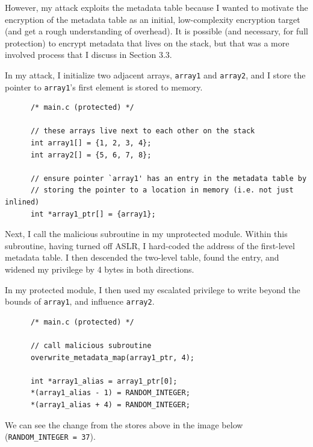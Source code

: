 \documentclass{article}
\begin{document}
            However, my attack exploits the metadata table because I wanted to
            motivate the encryption of the metadata table as an initial,
            low-complexity encryption target (and get a rough understanding of
            overhead). It is possible (and necessary, for full protection) 
            to encrypt metadata that lives on the stack, but that
            was a more involved process that I discuss in Section 3.3.

            \bigbreak{}

            In my attack, I initialize two adjacent arrays, \verb|array1| and
            \verb|array2|, and I store the pointer to  \verb|array1|'s first
            element is stored to memory.

            \begin{verbatim}
      /* main.c (protected) */

      // these arrays live next to each other on the stack
      int array1[] = {1, 2, 3, 4};
      int array2[] = {5, 6, 7, 8};

      // ensure pointer `array1' has an entry in the metadata table by
      // storing the pointer to a location in memory (i.e. not just inlined)
      int *array1_ptr[] = {array1};
            \end{verbatim}

            Next, I call the malicious subroutine in my unprotected module. Within this subroutine, having turned off ASLR, I
            hard-coded the address of the first-level metadata table.
            I then descended the two-level table, found the entry, and
            widened my privilege by 4 bytes in both directions.

            \bigbreak{}

            In my protected module, I then used my escalated privilege to write
            beyond the bounds of \verb|array1|, and influence \verb|array2|.
            \begin{verbatim}
      /* main.c (protected) */

      // call malicious subroutine
      overwrite_metadata_map(array1_ptr, 4);

      int *array1_alias = array1_ptr[0];
      *(array1_alias - 1) = RANDOM_INTEGER;
      *(array1_alias + 4) = RANDOM_INTEGER;
            \end{verbatim}
            We can see the change from the stores above in the image below
            (\verb|RANDOM_INTEGER = 37|). 
            
\end{document}
